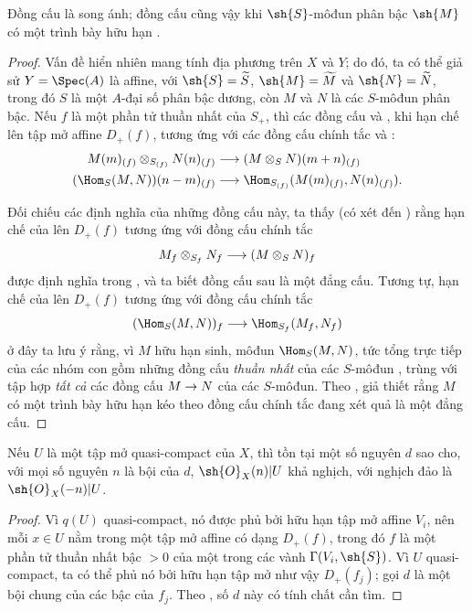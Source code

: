 \documentclass[oneside,10pt]{amsart}
\makeatletter
\newcommand{\ega@arrow}[2]{\mathchoice{#1}{#2}{#2}{#2}}
\renewcommand{\to}{\ega@arrow{\longrightarrow}{\rightarrow}}
\let\EGAOriginalLabel\label
\renewcommand{\label}[1]{\phantomsection\EGAOriginalLabel{#1}}
\makeatother
\begin{document}
\begin{proposition}[8.14.3]
\label{II.8.14.3}
Đồng cấu  là song ánh;
đồng cấu  cũng vậy khi $\sh{S}$-môđun phân bậc $\sh{M}$ có một trình bày hữu hạn .
\end{proposition}

\begin{proof}
Vấn đề hiển nhiên mang tính địa phương trên $X$ và $Y$;
do đó, ta có thể giả sử $Y=\Spec(A)$ là affine, với $\sh{S}=\widetilde{S}$, $\sh{M}=\widetilde{M}$ và $\sh{N}=\widetilde{N}$, trong đó $S$ là một $A$-đại số phân bậc dương, còn $M$ và $N$ là các $S$-môđun phân bậc.
Nếu $f$ là một phần tử thuần nhất của $S_+$, thì các đồng cấu  và , khi hạn chế lên tập mở affine $D_+(f)$, tương ứng với các đồng cấu chính tắc  và :
\begin{align*}
    M(m)_{(f)}\otimes_{S_{(f)}}N(n)_{(f)}
    &\to
    (M\otimes_S N)(m+n)_{(f)}
\\  (\Hom_S(M,N))(n-m)_{(f)}
    &\to
    \Hom_{S_{(f)}}(M(m)_{(f)},N(n)_{(f)}).
\end{align*}

Đối chiếu các định nghĩa của những đồng cấu này, ta thấy (có xét đến ) rằng hạn chế của  lên $D_+(f)$ tương ứng với đồng cấu chính tắc
\[
    M_f\otimes_{S_f}N_f \to (M\otimes_S N)_f
\]
được định nghĩa trong , và ta biết đồng cấu sau là một đẳng cấu.
Tương tự, hạn chế của  lên $D_+(f)$ tương ứng với đồng cấu chính tắc 
\[
    (\Hom_S(M,N))_f \to \Hom_{S_f}(M_f,N_f)
\]
ở đây ta lưu ý rằng, vì $M$ hữu hạn sinh, môđun $\Hom_S(M,N)$, tức tổng trực tiếp của các nhóm con gồm những đồng cấu \emph{thuần nhất} của các $S$-môđun , trùng với tập hợp \emph{tất cả} các đồng cấu $M\to N$ của các $S$-môđun.
Theo , giả thiết rằng $M$ có một trình bày hữu hạn kéo theo đồng cấu chính tắc đang xét quả là một đẳng cấu.
\end{proof}

\begin{proposition}[8.14.4]
\label{II.8.14.4}
Nếu $U$ là một tập mở quasi-compact của $X$, thì tồn tại một số nguyên $d$ sao cho, với mọi số nguyên $n$ là bội của $d$, $\sh{O}_X(n)|U$ khả nghịch, với nghịch đảo là $\sh{O}_X(-n)|U$.
\end{proposition}

\begin{proof}
Vì $q(U)$ quasi-compact, nó được phủ bởi hữu hạn tập mở affine $V_i$, nên mỗi $x\in U$ nằm trong một tập mở affine có dạng $D_+(f)$, trong đó $f$ là một phần tử thuần nhất bậc $>0$ của một trong các vành $\Gamma(V_i,\sh{S})$.
Vì $U$ quasi-compact, ta có thể phủ nó bởi hữu hạn tập mở như vậy $D_+(f_j)$;
gọi $d$ là một bội chung của các bậc của $f_j$.
Theo , số $d$ này có tính chất cần tìm.
\end{proof}
\end{document}
